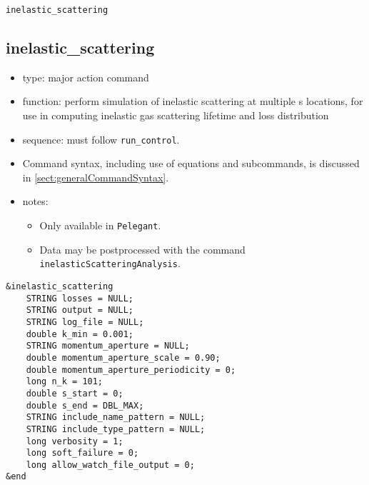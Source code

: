 \documentclass[11pt]{article}
\begin{document}
\newpage
\begin{center}{\Large\verb|inelastic_scattering|}\end{center}
\subsection{inelastic\_scattering \label{subsec:inelasticscattering}}

\begin{itemize}
\item type: major action command
\item function: perform simulation of inelastic scattering at multiple s locations, for
  use in computing inelastic gas scattering lifetime and loss distribution
\item sequence: must follow \verb|run_control|.
\item Command syntax, including use of equations and subcommands, is discussed in \ref{sect:generalCommandSyntax}.
\item notes: 
  \begin{itemize} 
    \item Only available in \verb|Pelegant|.
    \item Data may be postprocessed with the command \verb|inelasticScatteringAnalysis|.
    \end{itemize}
\end{itemize}

\begin{verbatim}
&inelastic_scattering
    STRING losses = NULL;
    STRING output = NULL;
    STRING log_file = NULL;
    double k_min = 0.001;
    STRING momentum_aperture = NULL;
    double momentum_aperture_scale = 0.90;
    double momentum_aperture_periodicity = 0;
    long n_k = 101;
    double s_start = 0;
    double s_end = DBL_MAX;
    STRING include_name_pattern = NULL;
    STRING include_type_pattern = NULL;
    long verbosity = 1;        
    long soft_failure = 0;
    long allow_watch_file_output = 0;
&end
\end{verbatim}
\end{document}
